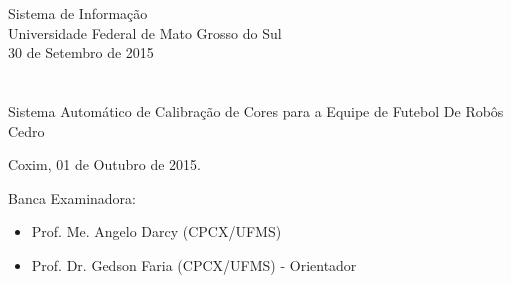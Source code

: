 \vskip 0.5cm
\begin{center}
Sistema de Informação\\
Universidade Federal de Mato Grosso do Sul\\
30 de Setembro de 2015
\end{center}


\chapter*{}

\begin{center}

\begin{minipage}[t]{10cm}
	\begin{center}
		\vspace{-2cm}
		{{\Large Sistema Automático de Calibração de Cores para a Equipe de Futebol De Robôs Cedro}}  
	\end{center}
\end{minipage}

\end{center}


\begin{flushright}
	\vspace{12cm}
	Coxim, 01 de Outubro de 2015.
\end{flushright}

\vspace{2cm}
Banca Examinadora:

\begin{itemize}
	\item Prof. Me. Angelo Darcy (CPCX/UFMS) 
	\item Prof. Dr. Gedson Faria (CPCX/UFMS) - Orientador
\end{itemize}
